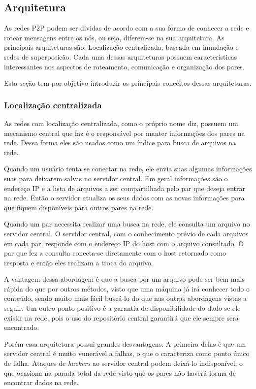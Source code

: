 \subsection{Arquitetura}

As redes P2P podem ser dividas de acordo com a sua forma de conhecer a rede e rotear mensagens entre os nós, ou seja, diferem-se na sua arquitetura. As principais arquiteturas são: Localização centralizada, baseada em inundação e redes de superposicão. Cada uma dessas arquiteturas possuem características interessantes nos aspectos de roteamento, comunicação e organização dos pares.

 Esta seção tem por objetivo introduzir os principais conceitos dessas arquiteturas.

\subsubsection{Localização centralizada}

As redes com localização centralizada, como o próprio nome diz, possuem um mecanismo central que faz é o responsável por manter informações dos pares na rede. Dessa forma eles são usados como um índice para busca de arquivos na rede.

Quando um usuário tenta se conectar na rede, ele envia suas algumas informações suas para deixarem salvas no servidor central. Em geral informações são o endereço IP e a lista de arquivos a ser compartilhada pelo par que deseja entrar na rede. Então o servidor atualiza os seus dados com as novas informações para que fiquem disponíveis para outros pares na rede.

Quando um par necessita realizar uma busca na rede, ele consulta um arquivo no servidor central. O servidor central, com o conhecimento prévio de cada arquivos em cada par, responde com o endereço IP do host com o arquivo consultado. O par que fez a consulta conecta-se diretamente com o host retornado como resposta e então eles realizam a troca do arquivo.

A vantagem dessa abordagem é que a busca por um arquivo pode ser bem mais rápida do que por outros métodos, visto que uma máquina já irá conhecer todo o conteúdo, sendo muito mais fácil buscá-lo do que nas outras abordagens vistas a seguir. Um outro ponto positivo é a garantia de disponibilidade do dado se ele existir na rede, pois o uso do repositório central garantirá que ele sempre será encontrado.

Porém essa arquitetura possui grandes desvantagens. A primeira delas é que um servidor central é muito vunerável a falhas, o que o caracteriza como ponto único de falha. Ataques de \emph{hackers} ao servidor central podem deixá-lo indisponível, o que ocasiona na parada total da rede visto que os pares não haverá forma de encontrar dados na rede.

